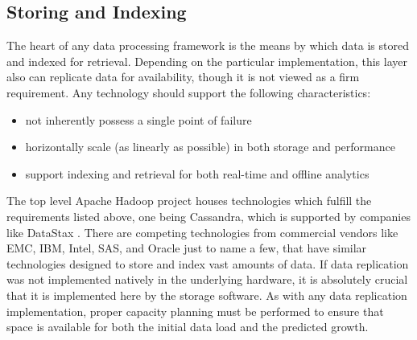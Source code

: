 \subsection{Storing and Indexing}
 The heart of any data processing framework is the means by which data is stored and indexed for retrieval. Depending on the particular implementation, this layer also can replicate data for availability, though it is not viewed as a firm requirement. Any technology should support the following characteristics:
\begin{itemize}
	\item not inherently possess a single point of failure
	\item horizontally scale (as linearly as possible) in both storage and performance
	\item support indexing and retrieval for both real-time and offline analytics
\end{itemize}
The top level Apache Hadoop project houses technologies which fulfill the requirements listed above, one being Cassandra, which is supported by companies like DataStax \cite{cassandra}. There are competing technologies from commercial vendors like EMC, IBM, Intel, SAS, and Oracle just to name a few, that have similar technologies designed to store and index vast amounts of data. If data replication was not implemented natively in the underlying hardware, it is absolutely crucial that it is implemented here by the storage software. As with any data replication implementation, proper capacity planning must be performed to ensure that space is available for both the initial data load and the predicted growth.\\

